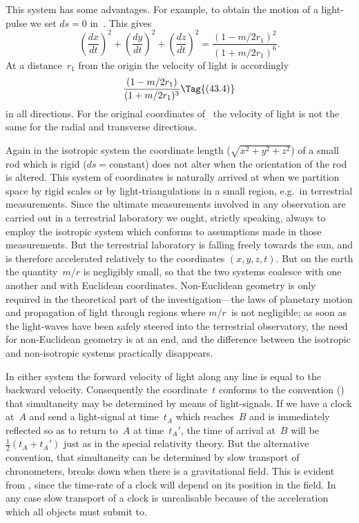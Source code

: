 \documentclass[12pt]{book}
\begin{document}
This system has some advantages. For example, to obtain the motion of
a light-pulse we set $ds = 0$ in~. This gives
\[
\left(\frac{dx}{dt}\right)^{2}
+ \left(\frac{dy}{dt}\right)^{2}
+ \left(\frac{dz}{dt}\right)^{2}
= \frac{(1 - m/2r_{1})^{2}}{(1 + m/2r_{1})^{6}}.
\]
At a distance~$r_{1}$ from the origin the velocity of light is accordingly
%
\[
\frac{(1 - m/2r_{1})}{(1 + m/2r_{1})^{3}}
\Tag{(43.4)}
\]
in all directions. For the original coordinates of~ the velocity of light is
not the same for the radial and transverse directions.

Again in the isotropic system the coordinate length ($\sqrt{x^{2} + y^{2} + z^{2}}$) of
a small rod which is rigid ($ds = \text{constant}$) does not alter when the orientation
of the rod is altered. This system of coordinates is naturally arrived at when
we partition space by rigid scales or by light\hyp{}triangulations in a small region,
e.g.\ in terrestrial measurements. Since the ultimate measurements involved
in any observation are carried out in a terrestrial laboratory we ought, strictly
speaking, always to employ the isotropic system which conforms to assumptions
made in those measurements\footnotemark.\footnotetext
  {But the terrestrial laboratory is falling freely towards the sun, and is therefore accelerated
  relatively to the coordinates $(x, y, z, t)$.}
But on the earth the quantity~$m/r$ is negligibly
small, so that the two systems coalesce with one another and with Euclidean
coordinates. Non\hyp{}Euclidean geometry is only required in the theoretical part
of the investigation---the laws of planetary motion and propagation of light
through regions where $m/r$~is not negligible; as soon as the light-waves have
been safely steered into the terrestrial observatory, the need for non\hyp{}Euclidean
geometry is at an end, and the difference between the isotropic and non\hyp{}isotropic
systems practically disappears.

In either system the forward velocity of light along any line is equal to
the backward velocity. Consequently the coordinate~$t$ conforms to the convention
() that simultaneity may be determined by means of light\hyp{}signals.
If we have a clock at~$A$ and send a light\hyp{}signal at time~$t_{A}$ which reaches~$B$
and is immediately reflected so as to return to~$A$ at time~$t_{A}'$, the time of arrival
at~$B$ will be $\frac{1}{2}(t_{A} + t_{A}')$ just as in the special relativity theory. But the alternative
convention, that simultaneity can be determined by slow transport of
chronometers, breaks down when there is a gravitational field. This is evident
from , since the time-rate of a clock will depend on its position in the field.
In any case slow transport of a clock is unrealisable because of the acceleration
which all objects must submit to.
\end{document}
